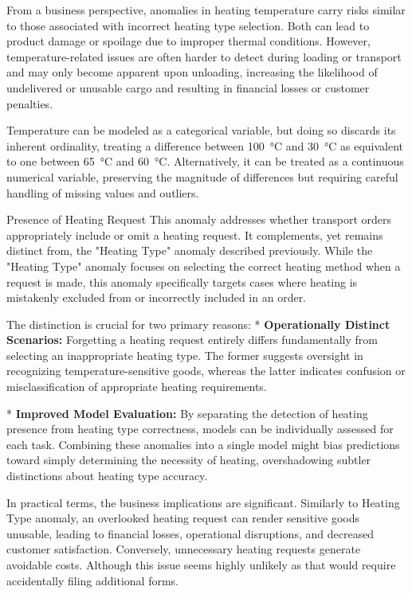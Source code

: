 From a business perspective, anomalies in heating temperature carry risks similar to those associated with incorrect heating type selection. Both can lead to product damage or spoilage due to improper thermal conditions. However, temperature-related issues are often harder to detect during loading or transport and may only become apparent upon unloading, increasing the likelihood of undelivered or unusable cargo and resulting in financial losses or customer penalties.

Temperature can be modeled as a categorical variable, but doing so discards its inherent ordinality, treating a difference between 100~°C and 30~°C as equivalent to one between 65~°C and 60~°C. Alternatively, it can be treated as a continuous numerical variable, preserving the magnitude of differences but requiring careful handling of missing values and outliers.

\sec Presence of Heating Request
This anomaly addresses whether transport orders appropriately include or omit a heating request. It complements, yet remains distinct from, the "Heating Type" anomaly described previously. While the "Heating Type" anomaly focuses on selecting the correct heating method when a request is made, this anomaly specifically targets cases where heating is mistakenly excluded from or incorrectly included in an order.

The distinction is crucial for two primary reasons:
\begitems
* {\bf Operationally Distinct Scenarios:}
Forgetting a heating request entirely differs fundamentally from selecting an inappropriate heating type. The former suggests oversight in recognizing temperature-sensitive goods, whereas the latter indicates confusion or misclassification of appropriate heating requirements.

* {\bf Improved Model Evaluation:}
By separating the detection of heating presence from heating type correctness, models can be individually assessed for each task. Combining these anomalies into a single model might bias predictions toward simply determining the necessity of heating, overshadowing subtler distinctions about heating type accuracy.
\enditems

In practical terms, the business implications are significant. Similarly to Heating Type anomaly, an overlooked heating request can render sensitive goods unusable, leading to financial losses, operational disruptions, and decreased customer satisfaction. Conversely, unnecessary heating requests generate avoidable costs. Although this issue seems highly unlikely as that would require accidentally filing additional forms.


